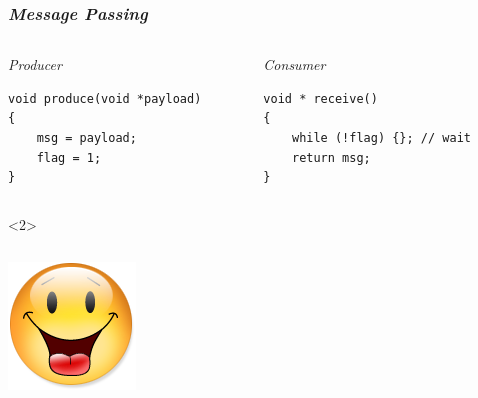 \documentclass[xcolor={x11names,svgnames},x11names,svgnames]{beamer}
\begin{document}
\begin{frame}[fragile, label=tso_mp]
  \frametitle{\emph{Message Passing} }
  
  \begin{columns}
    \begin{column}{0.5\textwidth}
      \begin{block}{\emph{Producer}}
\begin{verbatim}
void produce(void *payload)
{          
    msg = payload;
    flag = 1;
}
\end{verbatim}
      \end{block}
    \end{column}  
    \begin{column}{0.5\textwidth}
      \begin{block}{\emph{Consumer}}
\begin{verbatim}
void * receive()
{  
    while (!flag) {}; // wait
    return msg;
}
\end{verbatim}
      \end{block}
    \end{column}
  \end{columns}

  \begin{overlayarea}{\textwidth}{1cm}
    \begin{onlyenv}<2>
      \begin{columns}[c]
        \begin{column}{.1\textwidth}
          \vspace{1mm}
          \includegraphics[width=\textwidth]{Content.png}
        \end{column}


\end{columns}
\end{onlyenv}
\end{overlayarea}
\end{frame}
\end{document}
